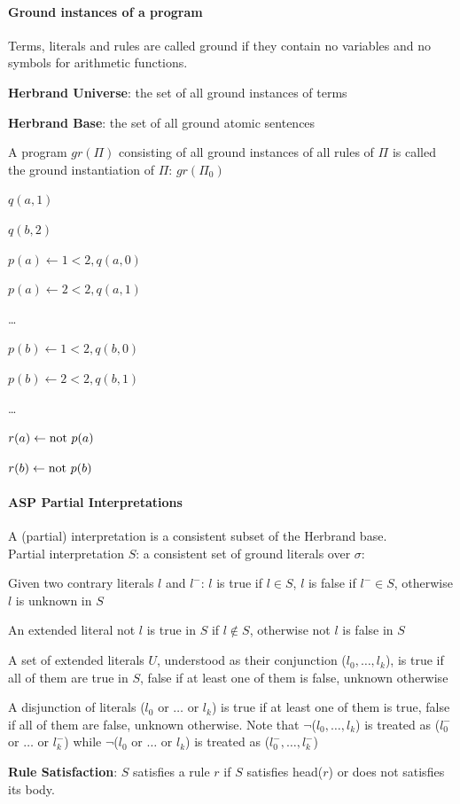\documentclass[10pt]{report}
\begin{document}
\paragraph{Ground instances of a program} Terms, literals and rules are called ground if they contain no variables and no symbols for arithmetic functions.\begin{list}{}{}
	\item \textbf{Herbrand Universe}: the set of all ground instances of terms
	\item \textbf{Herbrand Base}: the set of all ground atomic sentences
\end{list}
A program $gr(\Pi)$ consisting of all ground instances of all rules of $\Pi$ is called the ground instantiation of $\Pi$: $gr(\Pi_0)$\begin{list}{}{}
	\item $q(a,1)$
	\item $q(b,2)$
	\item $p(a)\leftarrow 1<2, q(a,0)$
	\item $p(a)\leftarrow 2<2, q(a,1)$
	\item \ldots
	\item $p(b)\leftarrow 1<2, q(b,0)$
	\item $p(b)\leftarrow 2<2, q(b,1)$
	\item \ldots
	\item $r(a)\leftarrow\hbox{not }p(a)$
	\item $r(b)\leftarrow\hbox{not }p(b)$
\end{list}
\paragraph{ASP Partial Interpretations} A (partial) interpretation is a consistent subset of the Herbrand base.\\
Partial interpretation $S$: a consistent set of ground literals over $\sigma$:
\begin{list}{}{}
	\item Given two contrary literals $l$ and $l^-$: $l$ is true if $l\in S$, $l$ is false if $l^-\in S$, otherwise $l$ is unknown in $S$
	\item An extended literal not $l$ is true in $S$ if $l\not\in S$, otherwise not $l$ is false in $S$
	\item A set of extended literals $U$, understood as their conjunction ($l_0,\ldots,l_k$), is true if all of them are true in $S$, false if at least one of them is false, unknown otherwise
	\item A disjunction of literals ($l_0$ or $\ldots$ or $l_k$) is true if at least one of them is true, false if all of them are false, unknown otherwise.
	Note that $\neg$($l_0,\ldots,l_k$) is treated as ($l_0^-$ or $\ldots$ or $l_k^-$) while $\neg$($l_0$ or $\ldots$ or $l_k$) is treated as ($l_0^-,\ldots,l_k^-$)
\end{list}
\textbf{Rule Satisfaction}: $S$ satisfies a rule $r$ if $S$ satisfies head($r$) or does not satisfies its body.
\end{document}
